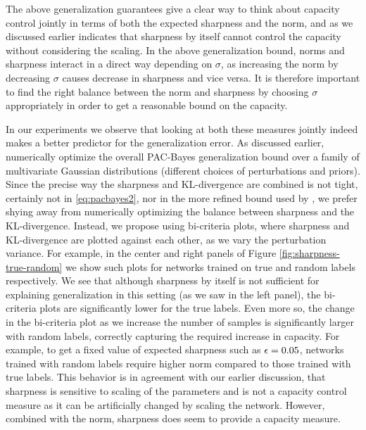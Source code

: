 \documentclass{article}
\begin{document}
The above generalization guarantees give a clear way to think about capacity control jointly in terms of both the expected sharpness and the norm, and as we discussed earlier indicates that sharpness by itself cannot control the capacity without considering the scaling. In the above generalization bound, norms and sharpness interact in a direct way depending on $\sigma$, as increasing the norm by decreasing $\sigma$ causes decrease in sharpness and vice versa. It is therefore important to find the right balance between the norm and sharpness by choosing $\sigma$ appropriately in order to get a reasonable bound on the capacity.

In our experiments we observe that looking at both these measures
jointly indeed makes a better predictor for the generalization error.
As discussed earlier, \citet{dziugaite2017computing} numerically
optimize the overall PAC-Bayes generalization bound over a family of
multivariate Gaussian distributions (different choices of
perturbations and priors). Since the precise way the sharpness and
KL-divergence are combined is not tight, certainly not in
\eqref{eq:pacbayes2}, nor in the more refined bound used by
\citet{dziugaite2017computing}, we prefer shying away from numerically
optimizing the balance between sharpness and the KL-divergence.
Instead, we propose using bi-criteria plots, where sharpness and
KL-divergence are plotted against each other, as we vary the
perturbation variance.  For example, in the center and right panels of
Figure \ref{fig:sharpness-true-random} we show such plots for networks
trained on true and random labels respectively.  We see that although
sharpness by itself is not sufficient for explaining generalization in
this setting (as we saw in the left panel), the bi-criteria plots are
significantly lower for the true labels.  Even more so, the change in
the bi-criteria plot as we increase the number of samples is
significantly larger with random labels, correctly capturing the
required increase in capacity.  For example, to get a fixed value of
expected sharpness such as $\epsilon=0.05$, networks trained with random
labels require higher norm compared to those trained with true labels.
This behavior is in agreement with our earlier discussion, that
sharpness is sensitive to scaling of the parameters and is not a
capacity control measure as it can be artificially changed by scaling
the network. However, combined with the norm, sharpness does seem to
provide a capacity measure.

\end{document}
